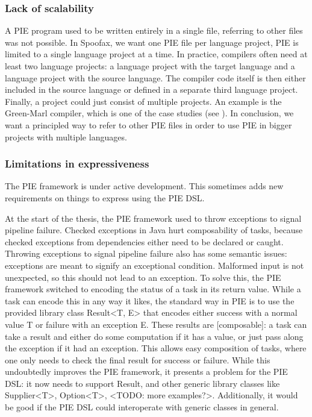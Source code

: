\subsubsection{Lack of scalability}
\label{subsubsec:problem_analysis__problems__scalability}

A PIE program used to be written entirely in a single file, referring to other files was not possible.
In Spoofax, we want one PIE file per language project, PIE is limited to a single language project at a time.
In practice, compilers often need at least two language projects: a language project with the target language and a language project with the source language.
The compiler code itself is then either included in the source language or defined in a separate third language project.
Finally, a project could just consist of multiple projects.
An example is the Green-Marl compiler, which is one of the case studies (see ).
In conclusion, we want a principled way to refer to other PIE files in order to use PIE in bigger projects with multiple languages.

\subsubsection{Limitations in expressiveness}
\label{subsubsec:problem_analysis__problems__expressiveness}

The PIE framework is under active development.
This sometimes adds new requirements on things to express using the PIE DSL.

At the start of the thesis, the PIE framework used to throw exceptions to signal pipeline failure.
Checked exceptions in Java hurt composability of tasks, because checked exceptions from dependencies either need to be declared or caught.
Throwing exceptions to signal pipeline failure also has some semantic issues: exceptions are meant to signify an exceptional condition.
Malformed input is not unexpected, so this should not lead to an exception.
To solve this, the PIE framework switched to encoding the status of a task in its return value.
While a task can encode this in any way it likes, the standard way in PIE is to use the provided library class Result<T, E> that encodes either success with a normal value T or failure with an exception E.
These results are [composable]: a task can take a result and either do some computation if it has a value, or just pass along the exception if it had an exception.
This allows easy composition of tasks, where one only needs to check the final result for success or failure.
While this undoubtedly improves the PIE framework, it presents a problem for the PIE DSL: it now needs to support Result, and other generic library classes like Supplier<T>, Option<T>, <TODO: more examples?>.
Additionally, it would be good if the PIE DSL could interoperate with generic classes in general. 

